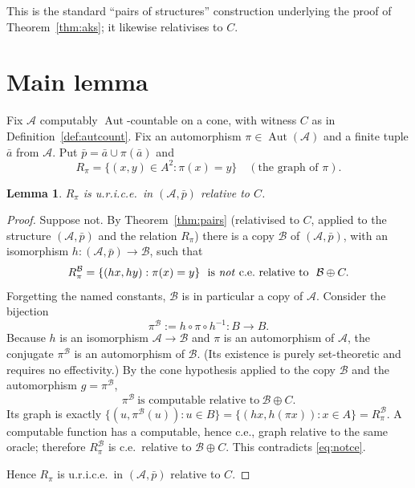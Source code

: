 \documentclass{article}
\newcommand{\A}{\mathcal{A}}
\newcommand{\B}{\mathcal{B}}
\newcommand{\AUT}{\operatorname{Aut}}
\newcommand{\bara}{\bar a}
\theoremstyle{plain}
\newtheorem{lemma}{Lemma}
\theoremstyle{definition}
\begin{document}
\noindent This is the standard ``pairs of structures'' construction underlying the
proof of Theorem~\ref{thm:aks}; it likewise relativises to $C$.

\section{Main lemma}

Fix $\A$ computably $\AUT$-countable on a cone, with witness $C$ as in
Definition~\ref{def:autcount}. Fix an automorphism $\pi\in\AUT(\A)$ and a finite tuple
$\bara$ from $\A$. Put $\bar p=\bara\cup\pi(\bara)$ and
\[
   R_\pi=\{(x,y)\in A^2:\pi(x)=y\}\quad(\text{the graph of }\pi).
\]

\begin{lemma}\label{lem:main}
$R_\pi$ is u.r.i.c.e.\ in $(\A,\bar p)$ relative to $C$.
\end{lemma}

\begin{proof}
Suppose not. By Theorem~\ref{thm:pairs} (relativised to $C$, applied to the structure
$(\A,\bar p)$ and the relation $R_\pi$) there is a copy $\B$ of $(\A,\bar p)$, with an
isomorphism $h:(\A,\bar p)\to\B$, such that
\begin{equation}\label{eq:notce}
   R_\pi^\B=\{(h x,h y):\pi(x)=y\}\ \text{ is \emph{not} c.e.\ relative to }\ \B\oplus C.
\end{equation}
Forgetting the named constants, $\B$ is in particular a copy of $\A$. Consider the
bijection
\[
   \pi^\B:=h\circ\pi\circ h^{-1}:B\to B .
\]
Because $h$ is an isomorphism $\A\to\B$ and $\pi$ is an automorphism of $\A$, the
conjugate $\pi^\B$ is an automorphism of $\B$. (Its existence is purely
set-theoretic and requires no effectivity.) By the cone hypothesis applied to the copy
$\B$ and the automorphism $g=\pi^\B$,
\[
   \pi^\B\ \text{is computable relative to}\ \B\oplus C .
\]
Its graph is exactly $\{(u,\pi^\B(u)):u\in B\}=\{(h x,h(\pi x)):x\in A\}=R_\pi^\B$.
A computable function has a computable, hence c.e., graph relative to the same oracle;
therefore $R_\pi^\B$ is c.e.\ relative to $\B\oplus C$. This contradicts
\eqref{eq:notce}.

Hence $R_\pi$ is u.r.i.c.e.\ in $(\A,\bar p)$ relative to $C$.
\end{proof}
\end{document}
